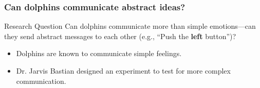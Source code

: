\documentclass[slidestop,compress,mathserif]{beamer}
\begin{document}
\begin{frame}
  \frametitle{Can dolphins communicate abstract ideas?}
    \begin{block}{Research Question}
        Can dolphins communicate more than simple emotions---can they send abstract messages to each other (e.g., ``Push the \textbf{left} button'')?
    \end{block}
    \vspace{0.5cm}
    \begin{itemize}
        \item Dolphins are known to communicate simple feelings.
        \item Dr. Jarvis Bastian designed an experiment to test for more complex communication.
    \end{itemize}
    \vspace{0.5cm}
    \begin{center}
    \end{center}
\end{frame}

\end{document}
